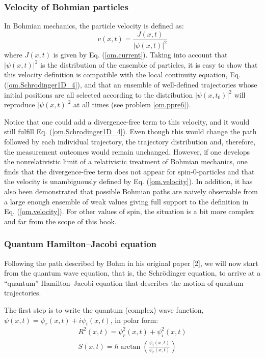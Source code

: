 \documentclass[nofootinbib, secnumarabic, amsmath, nobibnotes,11pt,aps,pra, floatfix]{revtex4-1}
\newcommand{\eref}[1]{Eq. (\ref{#1})}
\begin{document}
\subsubsection{Velocity of Bohmian particles}

In Bohmian mechanics, the particle velocity is defined as:
\begin{equation}
\label{om.velocity}
v(x,t) = \frac{J(x,t)}{|\psi(x,t)|^2}
\end{equation}
where $J(x,t)$ is given by \eref{om.current}.
Taking into account that $|\psi(x,t)|^2$ is the distribution of the ensemble of particles, it is easy to show that this velocity definition is compatible with the local continuity equation, \eref{om.Schrodinger1D_4}, and that an ensemble of well-defined trajectories whose initial positions are all selected according to the distribution $|\psi(x,t_0)|^2$ will reproduce $|\psi(x,t)|^2$ at all times (see problem \ref{om.ppre6}).

Notice that one could add a divergence-free term to this velocity, and it would still fulfill \eref{om.Schrodinger1D_4}. Even though this would change the path followed by each individual trajectory, the trajectory distribution and, therefore, the measurement outcomes would remain unchanged.
However, if one develops the nonrelativistic limit of a relativistic treatment of Bohmian mechanics, one finds that the divergence-free  term does not appear for spin-0-particles and that the velocity is unambiguously defined by \eref{om.velocity}. In addition, it has also been demonstrated that possible Bohmian paths are naively observable from a large enough ensemble of weak values \cite{om.wiseman2007,om.4marian,om.7colomes} giving full support to the definition in \eref{om.velocity}. For other values of spin, the situation is a bit more complex \cite{om.ward2010,om.Holland1999,om.Holland2003} and far from the scope of this book.

\subsubsection{Quantum Hamilton--Jacobi equation}\label{sec.quantum_HJ.om}

Following the path described by Bohm in his original paper  [2], we
will now start from the quantum wave equation, that is, the
Schr\"odinger equation, to arrive at a ``quantum'' Hamilton--Jacobi
equation that describes the motion of quantum trajectories.

The first step is to write the quantum (complex) wave function, $\psi(x,t) = \psi_r(x,t) + i \psi_i(x,t)$, in polar form:
\begin{eqnarray}
R^2(x,t) = \psi_{r}^2(x,t) + \psi_{i}^2(x,t) \label{om.polar1D_1} \\
S(x,t) = \hbar \arctan \left(\frac {\psi_{i}(x,t)} {\psi_{r}(x,t)} \right)
\label{om.polar1D_2}
\end{eqnarray}
\end{document}
